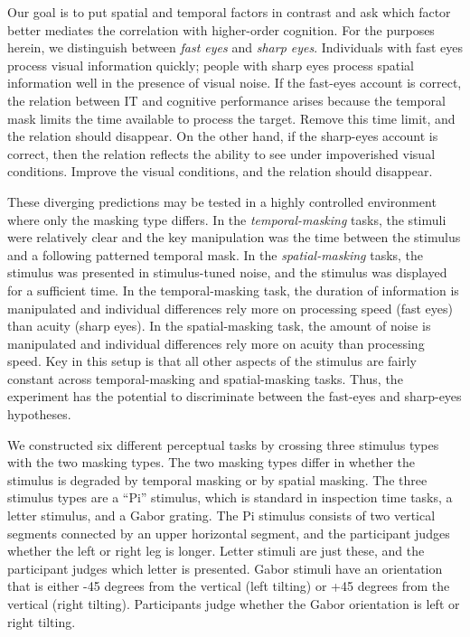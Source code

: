 \documentclass[
  ,man]{apa6}
\begin{document}
Our goal is to put spatial and temporal factors in contrast and ask which factor better mediates the correlation with higher-order cognition. For the purposes herein, we distinguish between \emph{fast eyes} and \emph{sharp eyes}. Individuals with fast eyes process visual information quickly; people with sharp eyes process spatial information well in the presence of visual noise. If the fast-eyes account is correct, the relation between IT and cognitive performance arises because the temporal mask limits the time available to process the target. Remove this time limit, and the relation should disappear. On the other hand, if the sharp-eyes account is correct, then the relation reflects the ability to see under impoverished visual conditions. Improve the visual conditions, and the relation should disappear.

These diverging predictions may be tested in a highly controlled environment where only the masking type differs. In the \emph{temporal-masking} tasks, the stimuli were relatively clear and the key manipulation was the time between the stimulus and a following patterned temporal mask. In the \emph{spatial-masking} tasks, the stimulus was presented in stimulus-tuned noise, and the stimulus was displayed for a sufficient time. In the temporal-masking task, the duration of information is manipulated and individual differences rely more on processing speed (fast eyes) than acuity (sharp eyes). In the spatial-masking task, the amount of noise is manipulated and individual differences rely more on acuity than processing speed. Key in this setup is that all other aspects of the stimulus are fairly constant across temporal-masking and spatial-masking tasks. Thus, the experiment has the potential to discriminate between the fast-eyes and sharp-eyes hypotheses.

We constructed six different perceptual tasks by crossing three stimulus types with the two masking types. The two masking types differ in whether the stimulus is degraded by temporal masking or by spatial masking. The three stimulus types are a ``Pi'' stimulus, which is standard in inspection time tasks, a letter stimulus, and a Gabor grating. The Pi stimulus consists of two vertical segments connected by an upper horizontal segment, and the participant judges whether the left or right leg is longer. Letter stimuli are just these, and the participant judges which letter is presented. Gabor stimuli have an orientation that is either -45 degrees from the vertical (left tilting) or +45 degrees from the vertical (right tilting). Participants judge whether the Gabor orientation is left or right tilting.
\end{document}
